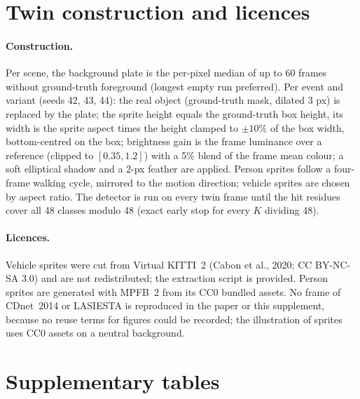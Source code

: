 \documentclass[11pt]{article}
\theoremstyle{definition}
\theoremstyle{remark}
\begin{document}
\section{Twin construction and licences}\label{sec:twin}
\paragraph{Construction.} Per scene, the background plate is the per-pixel median of up to 60 frames without ground-truth
foreground (longest empty run preferred). Per event and variant (seeds 42, 43, 44): the real object (ground-truth mask,
dilated 3 px) is replaced by the plate; the sprite height equals the ground-truth box height, its width is the sprite
aspect times the height clamped to $\pm10\%$ of the box width, bottom-centred on the box; brightness gain is the frame
luminance over a reference (clipped to $[0.35,1.2]$) with a 5\% blend of the frame mean colour; a soft elliptical shadow
and a 2-px feather are applied. Person sprites follow a four-frame walking cycle, mirrored to the motion direction;
vehicle sprites are chosen by aspect ratio. The detector is run on every twin frame until the hit residues cover all 48
classes modulo 48 (exact early stop for every $K$ dividing 48).
\paragraph{Licences.} Vehicle sprites were cut from Virtual KITTI~2 (Cabon et al., 2020; CC BY-NC-SA 3.0) and are not
redistributed; the extraction script is provided. Person sprites are generated with MPFB~2 from its CC0 bundled assets.
No frame of CDnet~2014 or LASIESTA is reproduced in the paper or this supplement, because no reuse terms for figures
could be recorded; the illustration of sprites uses CC0 assets on a neutral background.

\section{Supplementary tables}




\end{document}
